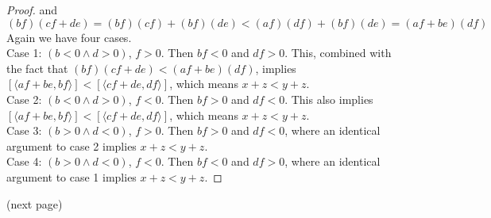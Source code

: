 \documentclass{report}
\begin{document}
\begin{proof}
and
\begin{equation*}
(bf)(cf+de)=(bf)(cf)+(bf)(de)<(af)(df)+(bf)(de)=(af+be)(df)
\end{equation*}
Again we have four cases.\\
\indent Case 1: $(b<0\land d>0)$, $f>0$. Then $bf<0$ and $df>0$. This, combined with the fact that 
$(bf)(cf+de)<(af+be)(df)$, implies $[\langle af+be,bf\rangle]<[\langle cf+de,df\rangle]$, which means $x+z<y+z$.\\
\indent Case 2: $(b<0\land d>0)$, $f<0$. Then $bf>0$ and $df<0$. This also implies $[\langle af+be,bf\rangle]<[\langle cf+de,df\rangle]$, which means $x+z<y+z$.\\
\indent Case 3: $(b>0\land d<0)$, $f>0$. Then $bf>0$ and $df<0$, where an identical argument to case 2 implies $x+z<y+z$.\\
\indent Case 4: $(b>0\land d<0)$, $f<0$. Then $bf<0$ and $df>0$, where an identical argument to case 1 implies $x+z<y+z$.
\end{proof}
\noindent(next page)\newpage
\end{document}
